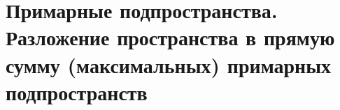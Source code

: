 \section{Примарные подпространства. Разложение пространства в прямую сумму (максимальных) примарных подпространств}
